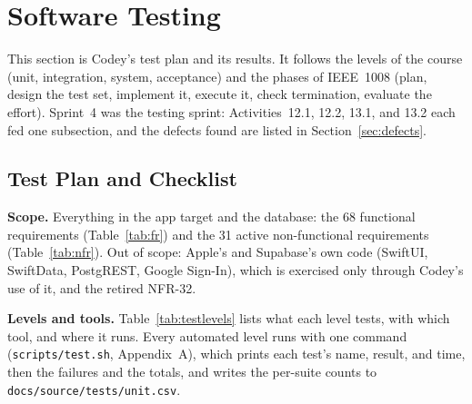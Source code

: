 \documentclass[12pt,letterpaper]{article}
\begin{document}
\section{Software Testing}\label{sec:testing}
This section is Codey's test plan and its results. It follows the levels of the
course (unit, integration, system, acceptance) and the phases of IEEE~1008 (plan,
design the test set, implement it, execute it, check termination, evaluate the
effort). Sprint~4 was the testing sprint: Activities~12.1, 12.2, 13.1, and 13.2 each
fed one subsection, and the defects found are listed in Section~\ref{sec:defects}.

\subsection{Test Plan and Checklist}\label{sec:testplan}
\textbf{Scope.} Everything in the app target and the database: the 68 functional
requirements (Table~\ref{tab:fr}) and the 31 active non-functional requirements
(Table~\ref{tab:nfr}). Out of scope: Apple's and Supabase's own code (SwiftUI,
SwiftData, PostgREST, Google Sign-In), which is exercised only through Codey's use of
it, and the retired NFR-32.

\textbf{Levels and tools.} Table~\ref{tab:testlevels} lists what each level tests,
with which tool, and where it runs. Every automated level runs with one command
(\texttt{scripts/test.sh}, Appendix~A), which prints each test's name, result, and
time, then the failures and the totals, and writes the per-suite counts to
\texttt{docs/source/tests/unit.csv}.
\end{document}
